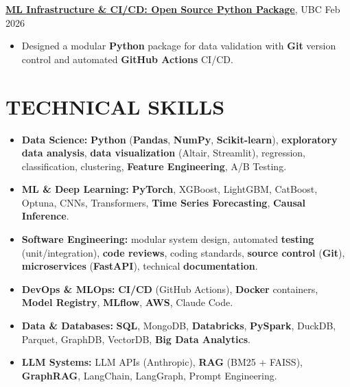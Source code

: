\documentclass[10pt,a4paper]{article}
\begin{document}
\vspace{1pt}

\textbf{\href{https://github.com/UBC-MDS/DSCI_524_G26_Data_Validation}{ML Infrastructure \& CI/CD: Open Source Python Package}}, UBC \hfill \small{Feb 2026}
\begin{itemize}[leftmargin=*, itemsep=1pt, topsep=1pt]
    \item Designed a modular \textbf{Python} package for data validation with \textbf{Git}
    version control and automated \textbf{GitHub Actions} CI/CD.
\end{itemize}

\section*{TECHNICAL SKILLS}
\begin{itemize}[leftmargin=*, itemsep=1pt, topsep=1pt]
    \item \textbf{Data Science:} \textbf{Python} (\textbf{Pandas}, \textbf{NumPy},
    \textbf{Scikit-learn}), \textbf{exploratory data analysis}, \textbf{data visualization}
    (Altair, Streamlit), regression, classification, clustering, \textbf{Feature Engineering},
    A/B Testing.
    \item \textbf{ML \& Deep Learning:} \textbf{PyTorch}, XGBoost, LightGBM, CatBoost, Optuna,
    CNNs, Transformers, \textbf{Time Series Forecasting}, \textbf{Causal Inference}.
    \item \textbf{Software Engineering:} modular system design, automated \textbf{testing}
    (unit/integration), \textbf{code reviews}, coding standards, \textbf{source control}
    (\textbf{Git}), \textbf{microservices} (\textbf{FastAPI}), technical
    \textbf{documentation}.
    \item \textbf{DevOps \& MLOps:} \textbf{CI/CD} (GitHub Actions), \textbf{Docker}
    containers, \textbf{Model Registry}, \textbf{MLflow}, \textbf{AWS}, Claude Code.
    \item \textbf{Data \& Databases:} \textbf{SQL}, MongoDB, \textbf{Databricks},
    \textbf{PySpark}, DuckDB, Parquet, GraphDB, VectorDB, \textbf{Big Data Analytics}.
    \item \textbf{LLM Systems:} LLM APIs (Anthropic), \textbf{RAG} (BM25 + FAISS),
    \textbf{GraphRAG}, LangChain, LangGraph, Prompt Engineering.
\end{itemize}
\end{document}
